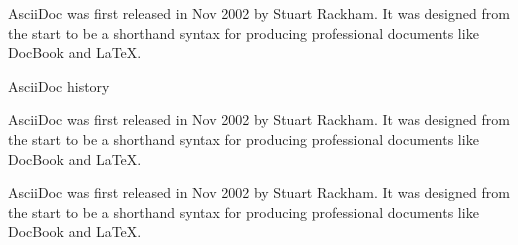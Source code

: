 \begin{sidebar}
AsciiDoc was first released in Nov 2002 by Stuart Rackham.
It was designed from the start to be a shorthand syntax
for producing professional documents like DocBook and LaTeX.
\end{sidebar}

\begin{sidebar}
\begin{bf}
AsciiDoc history
\end{bf}
AsciiDoc was first released in Nov 2002 by Stuart Rackham.
It was designed from the start to be a shorthand syntax
for producing professional documents like DocBook and LaTeX.
\end{sidebar}

\begin{sidebar}
\hypertarget{origin}{AsciiDoc was first released in Nov 2002 by Stuart Rackham.
It was designed from the start to be a shorthand syntax
for producing professional documents like DocBook and LaTeX.}
\end{sidebar}
